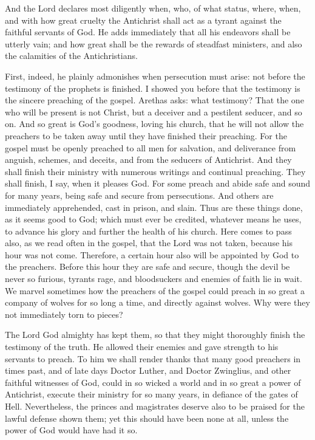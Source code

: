 And the Lord declares most diligently when, who, of what status, where, when, and with how great cruelty the Antichrist shall act as a tyrant against the faithful servants of God. He adds immediately that all his endeavors shall be utterly vain; and how great shall be the rewards of steadfast ministers, and also the calamities of the Antichristians.

First, indeed, he plainly admonishes when persecution must arise: not before the testimony of the prophets is finished. I showed you before that the testimony is the sincere preaching of the gospel. Arethas asks: what testimony? That the one who will be present is not Christ, but a deceiver and a pestilent seducer, and so on. And so great is God’s goodness, loving his church, that he will not allow the preachers to be taken away until they have finished their preaching. For the gospel must be openly preached to all men for salvation, and deliverance from anguish, schemes, and deceits, and from the seducers of Antichrist. And they shall finish their ministry with numerous writings and continual preaching. They shall finish, I say, when it pleases God. For some preach and abide safe and sound for many years, being safe and secure from persecutions. And others are immediately apprehended, cast in prison, and slain. Thus are these things done, as it seems good to God; which must ever be credited, whatever means he uses, to advance his glory and further the health of his church. Here comes to pass also, as we read often in the gospel, that the Lord was not taken, because his hour was not come. Therefore, a certain hour also will be appointed by God to the preachers. Before this hour they are safe and secure, though the devil be never so furious, tyrants rage, and bloodsuckers and enemies of faith lie in wait. We marvel sometimes how the preachers of the gospel could preach in so great a company of wolves for so long a time, and directly against wolves. Why were they not immediately torn to pieces?

The Lord God almighty has kept them, so that they might thoroughly finish the testimony of the truth. He allowed their enemies and gave strength to his servants to preach. To him we shall render thanks that many good preachers in times past, and of late days Doctor Luther, and Doctor Zwinglius, and other faithful witnesses of God, could in so wicked a world and in so great a power of Antichrist, execute their ministry for so many years, in defiance of the gates of Hell. Nevertheless, the princes and magistrates deserve also to be praised for the lawful defense shown them; yet this should have been none at all, unless the power of God would have had it so.

